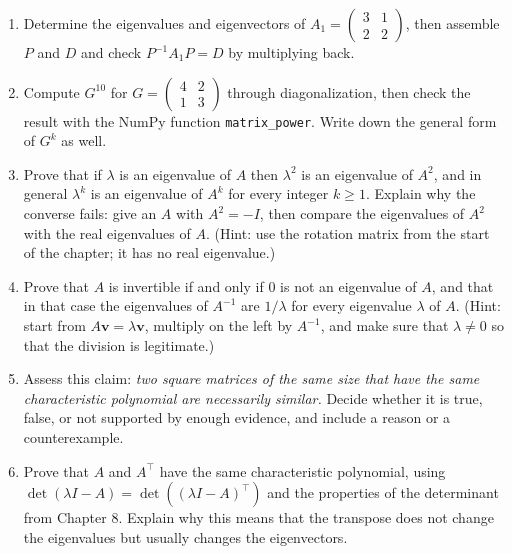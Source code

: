 \begin{latihan}
\begin{enumerate}
  \item Determine the eigenvalues and eigenvectors of
        $A_{1}=\begin{pmatrix}3&1\\ 2&2\end{pmatrix}$, then assemble $P$ and $D$ and check
        $P^{-1}A_{1}P=D$ by multiplying back.

  \item Compute $G^{10}$ for $G=\begin{pmatrix}4&2\\ 1&3\end{pmatrix}$ through diagonalization,
        then check the result with the NumPy function \texttt{matrix\_power}. Write down the
        general form of $G^{k}$ as well.

  \item Prove that if $\lambda$ is an eigenvalue of $A$ then $\lambda^{2}$ is an eigenvalue of
        $A^{2}$, and in general $\lambda^{k}$ is an eigenvalue of $A^{k}$ for every integer
        $k\ge1$. Explain why the converse fails: give an $A$ with $A^{2}=-I$, then compare the
        eigenvalues of $A^{2}$ with the real eigenvalues of $A$.
        (Hint: use the rotation matrix from the start of the chapter; it has no real eigenvalue.)

  \item Prove that $A$ is invertible if and only if $0$ is not an eigenvalue of $A$, and that in
        that case the eigenvalues of $A^{-1}$ are $1/\lambda$ for every eigenvalue $\lambda$ of
        $A$.
        (Hint: start from $A\mathbf{v}=\lambda\mathbf{v}$, multiply on the left by $A^{-1}$, and
        make sure that $\lambda\neq0$ so that the division is legitimate.)

  \item Assess this claim: \emph{two square matrices of the same size that have the same
        characteristic polynomial are necessarily similar.} Decide whether it is true, false, or
        not supported by enough evidence, and include a reason or a counterexample.

  \item Prove that $A$ and $A^{\top}$ have the same characteristic polynomial, using
        $\det(\lambda I-A)=\det((\lambda I-A)^{\top})$ and the properties of the determinant from
        Chapter 8. Explain why this means that the transpose does not change the eigenvalues but
        usually changes the eigenvectors.


\end{enumerate}
\end{latihan}
